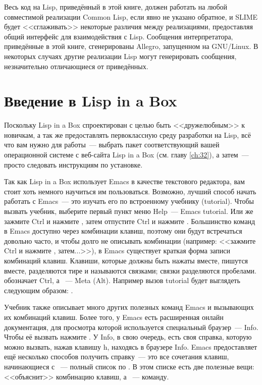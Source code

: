 Весь код на Lisp, приведённый в этой книге, должен работать на любой совместимой
реализации Common Lisp, если явно не указано обратное, и SLIME будет <<сглаживать>>
некоторые различия между реализациями, предоставляя общий интерфейс для взаимодействия с
Lisp. Сообщения интерпретатора, приведённые в этой книге, сгенерированы Allegro,
запущенном на GNU/Linux. В некоторых случаях другие реализации Lisp могут
генерировать сообщения, незначительно отличающиеся от приведённых.

\section{Введение в Lisp in a Box}

Поскольку Lisp in a Box спроектирован с целью быть <<дружелюбным>> к новичкам, а
так же предоставлять первоклассную среду разработки на Lisp, всё что вам нужно для
работы~--- выбрать пакет соответствующий вашей операционной системе с веб-сайта
Lisp in a Box (см. главу \ref{ch:32}), а затем~--- просто следовать инструкциям
по установке.

Так как Lisp in a Box использует Emacs в качестве текстового редактора, вам стоит хоть
немного научиться им пользоваться. Возможно, лучший способ начать работать с Emacs~--- это
изучать его по встроенному учебнику (tutorial). Чтобы вызвать учебник, выберите первый
пункт меню Help~--- Emacs tutorial. Или же зажмите Ctrl и нажмите , затем отпустите Ctrl и
нажмите . Большинство команд в Emacs доступно через комбинации клавиш, поэтому они будут
встречаться довольно часто, и чтобы долго не описывать комбинации (например: <<зажмите Ctrl
и нажмите , затем...>>), в Emacs существует краткая форма записи комбинаций
клавиш. Клавиши, которые должны быть нажаты вместе, пишутся вместе, разделяются тире и
называются связками; связки разделяются пробелами.  обозначает Ctrl, а ~--- Meta
(Alt). Например вызов tutorial будет выглядеть следующим образом: .

Учебник также описывает много других полезных команд Emacs и вызывающих их комбинаций
клавиш. Более того, у Emacs есть расширенная онлайн документация, для просмотра которой
используется специальный браузер~--- Info. Чтобы её вызвать нажмите . У Info,
в свою очередь, есть своя справка, которую можно вызвать, нажав клавишу h, находясь в браузере Info. Emacs
предоставляет ещё несколько способов получить справку~--- это все сочетания клавиш,
начинающиеся с ~--- полный список по . В этом списке есть две
полезные вещи:  <<объяснит>> комбинацию клавиш, а ~--- команду.


